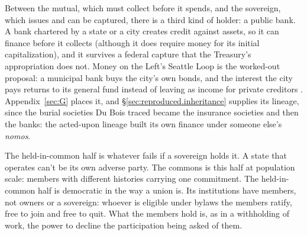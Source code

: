 Between the mutual, which must collect before it spends, and the sovereign, which issues and can be captured, there is a third kind of holder: a public bank. A bank chartered by a state or a city creates credit against assets, so it can finance before it collects (although it does require money for its initial capitalization), and it survives a federal capture that the Treasury's appropriation does not. Money on the Left's Seattle Loop is the worked-out proposal: a municipal bank buys the city's own bonds, and the interest the city pays returns to its general fund instead of leaving as income for private creditors \autocite{suksawat2026seattle,beaman2026prototyping}. Appendix~\ref{sec:G} places it, and \S\ref{sec:reproduced.inheritance} supplies its lineage, since the burial societies Du Bois traced became the insurance societies and then the banks: the acted-upon lineage built its own finance under someone else's \emph{nomos}.

The held-in-common half is whatever fails if a sovereign holds it. A state that operates can't be its own adverse party.
The commons is this half at population scale: members with different histories carrying one commitment. The held-in-common half is democratic in the way a union is. Its institutions have members, not owners or a sovereign: whoever is eligible under bylaws the members ratify, free to join and free to quit.
What the members hold is, as in a withholding of work, the power to decline the participation being asked of them.

